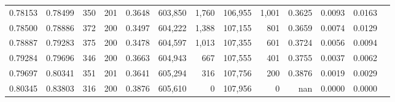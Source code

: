 \begin{tabular}{rrrrrrrrrrrrr}
0.78153 & 0.78499 &   350 & 201 &                                     0.3648 & 603,850 &   1,760 & 106,955 &   1,001 & 0.3625 & 0.0093 & 0.0163 \\
0.78500 & 0.78886 &   372 & 200 &                                     0.3497 & 604,222 &   1,388 & 107,155 &     801 & 0.3659 & 0.0074 & 0.0129 \\
0.78887 & 0.79283 &   375 & 200 &                                     0.3478 & 604,597 &   1,013 & 107,355 &     601 & 0.3724 & 0.0056 & 0.0094 \\
0.79284 & 0.79696 &   346 & 200 &                                     0.3663 & 604,943 &     667 & 107,555 &     401 & 0.3755 & 0.0037 & 0.0062 \\
0.79697 & 0.80341 &   351 & 201 &                                     0.3641 & 605,294 &     316 & 107,756 &     200 & 0.3876 & 0.0019 & 0.0029 \\
0.80345 & 0.83803 &   316 & 200 &                                     0.3876 & 605,610 &       0 & 107,956 &       0 &    nan & 0.0000 & 0.0000 \\
\bottomrule
\end{tabular}
